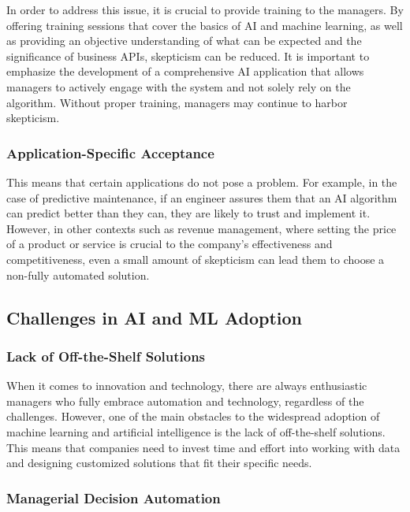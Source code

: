 In order to address this issue, it is crucial to provide training to the
managers. By offering training sessions that cover the basics of AI and
machine learning, as well as providing an objective understanding of
what can be expected and the significance of business APIs, skepticism
can be reduced. It is important to emphasize the development of a
comprehensive AI application that allows managers to actively engage
with the system and not solely rely on the algorithm. Without proper
training, managers may continue to harbor skepticism.

\subsubsection{Application-Specific Acceptance}

This means that certain applications do not pose a problem. For example,
in the case of predictive maintenance, if an engineer assures them that
an AI algorithm can predict better than they can, they are likely to
trust and implement it. However, in other contexts such as revenue
management, where setting the price of a product or service is crucial
to the company's effectiveness and competitiveness, even a small amount
of skepticism can lead them to choose a non-fully automated solution.

\subsection{Challenges in AI and ML Adoption}

\subsubsection{Lack of Off-the-Shelf Solutions}

When it comes to innovation and technology, there are always
enthusiastic managers who fully embrace automation and technology,
regardless of the challenges. However, one of the main obstacles to the
widespread adoption of machine learning and artificial intelligence is
the lack of off-the-shelf solutions. This means that companies need to
invest time and effort into working with data and designing customized
solutions that fit their specific needs.

\subsubsection{Managerial Decision Automation}

